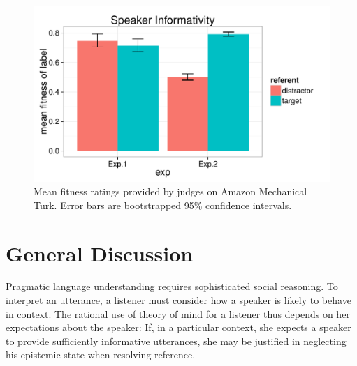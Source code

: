 \documentclass[10pt,letterpaper]{article}
\begin{document}
\begin{figure}[t!]
\begin{center}
\includegraphics[scale=.5]{images/fitnessInteraction.pdf}
\caption{Mean fitness ratings provided by judges on Amazon Mechanical Turk. Error bars are bootstrapped 95\% confidence intervals.}
\label{fig:fitnessInteraction}
\end{center}
\end{figure}


\section{General Discussion}

Pragmatic language understanding requires sophisticated social reasoning. To interpret an utterance, a listener must consider how a speaker is likely to behave in context.
The rational use of theory of mind for a listener thus depends on her expectations about the speaker: If, in a particular context, she expects a speaker to provide sufficiently informative utterances, she may be justified in neglecting his epistemic state when resolving reference.
\end{document}
